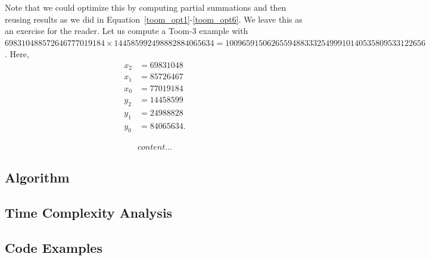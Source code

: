 \documentclass[psamsfonts,reqno]{amsart}
\theoremstyle{definition}
\theoremstyle{remark}
\numberwithin{equation}{section}
\begin{document}
Note that we could optimize this by computing partial summations and then reusing results as we did in Equation~\ref{toom_opt1}-\ref{toom_opt6}. We leave this as an exercise for the reader. Let us compute a Toom-3 example with $\num{698310488572646777019184} \times \num{144585992498882884065634} = 
\num{100965915062655948833325499910140535809533122656}$. Here,
\begin{align*}
	x_2 &= 69831048 \\
	x_1 &= 85726467 \\
	x_0 &= 77019184 \\
	y_2 &= 14458599 \\
	y_1 &= 24988828 \\
	y_0 &= 84065634.
\end{align*}

\begin{align*}
	content...
\end{align*}

\subsection{Algorithm \nopunct}



\subsection{Time Complexity Analysis \nopunct}



\subsection{Code Examples \nopunct}
\end{document}
